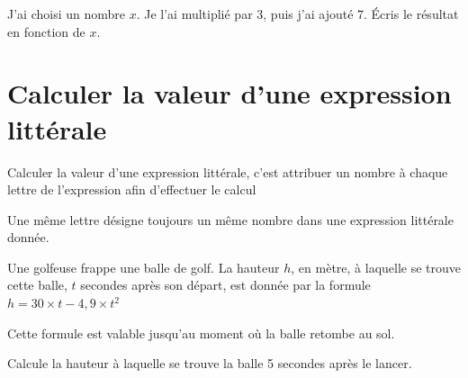 \documentclass[a4paper,10pt]{report}
\begin{document}
\begin{ex} 
\vspace{-5.5mm} \hspace{2.8cm} J'ai choisi un nombre $x$. Je l'ai multiplié par $3$, puis j'ai ajouté $7$.
Écris le résultat en fonction de $x$.

\medskip
\noindent\grandscarreaux{\linewidth}{1.6cm}
\end{ex}

\vspace{-3mm}
\section{Calculer la valeur d'une expression littérale}

\vspace{-2mm}
\begin{defn}
Calculer la valeur d'une expression littérale, c'est attribuer un nombre à chaque lettre de l'expression afin d'effectuer le calcul
\end{defn}

\begin{rem}

\vspace{-4.5mm} \hspace{3cm} Une même lettre désigne toujours un même nombre dans une expression littérale donnée.
\end{rem}

\vspace{-2mm}
\begin{meth}
Une golfeuse frappe une balle de golf.
La hauteur $h$, en mètre, à laquelle se trouve cette balle, $t$ secondes après son départ, est
donnée par la formule $h = 30 \times t - 4,9 \times t^2$

\medskip
\noindent Cette formule est valable jusqu'au moment où la balle retombe au sol.

\medskip
\noindent Calcule la hauteur à laquelle se trouve la balle 5 secondes après le lancer.

\medskip
\noindent\grandscarreaux{\linewidth}{4cm}
\end{meth}
\end{document}

